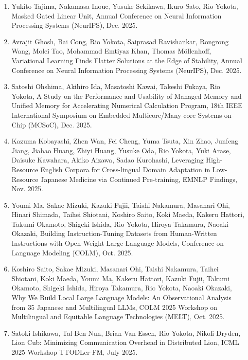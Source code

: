 \documentclass[margin,line]{cv}
\begin{document}
\begin{resume}
\begin{enumerate}
\item Yukito Tajima, Nakamasa Inoue, Yusuke Sekikawa, Ikuro Sato, Rio Yokota, Masked Gated Linear Unit, Annual Conference on Neural Information Processing Systems (NeurIPS), Dec. 2025.

\item Avrajit Ghosh, Bai Cong, Rio Yokota, Saiprasad Ravishankar, Rongrong Wang, Molei Tao, Mohammad Emtiyaz Khan, Thomas M\"{o}llenhoff, Variational Learning Finds Flatter Solutions at the Edge of Stability, Annual Conference on Neural Information Processing Systems (NeurIPS), Dec. 2025.

\item Satoshi Ohshima, Akihiro Ida, Masatoshi Kawai, Takeshi Fukaya, Rio Yokota, A Study on the Performance and Usability of Managed Memory and Unified Memory for Accelerating Numerical Calculation Program, 18th IEEE International Symposium on Embedded Multicore/Many-core Systems-on-Chip (MCSoC), Dec. 2025.

\item Kazuma Kobayashi, Zhen Wan, Fei Cheng, Yuma Tsuta, Xin Zhao, Junfeng Jiang, Jiahao Huang, Zhiyi Huang, Yusuke Oda, Rio Yokota, Yuki Arase, Daisuke Kawahara, Akiko Aizawa, Sadao Kurohashi, Leveraging High-Resource English Corpora for Cross-lingual Domain Adaptation in Low-Resource Japanese Medicine via Continued Pre-training, EMNLP Findings, Nov. 2025.

\item Youmi Ma, Sakae Mizuki, Kazuki Fujii, Taishi Nakamura, Masanari Ohi, Hinari Shimada, Taihei Shiotani, Koshiro Saito, Koki Maeda, Kakeru Hattori, Takumi Okamoto, Shigeki Ishida, Rio Yokota, Hiroya Takamura, Naoaki Okazaki, Building Instruction-Tuning Datasets from Human-Written Instructions with Open-Weight Large Language Models, Conference on Language Modeling (COLM), Oct. 2025.

\item Koshiro Saito, Sakae Mizuki, Masanari Ohi, Taishi Nakamura, Taihei Shiotani, Koki Maeda, Youmi Ma, Kakeru Hattori, Kazuki Fujii, Takumi Okamoto, Shigeki Ishida, Hiroya Takamura, Rio Yokota, Naoaki Okazaki, Why We Build Local Large Language Models: An Observational Analysis from 35 Japanese and Multilingual LLMs, COLM 2025 Workshop on Multilingual and Equitable Language Technologies (MELT), Oct. 2025.

\item Satoki Ishikawa, Tal Ben-Nun, Brian Van Essen, Rio Yokota, Nikoli Dryden, Lion Cub: Minimizing Communication Overhead in Distributed Lion, ICML 2025 Workshop TTODLer-FM, July 2025.


\end{enumerate}
\end{resume}
\end{document}
